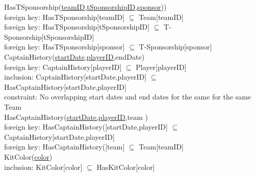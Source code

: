{\color{ForestGreen}HasTSponsorship(\underline{teamID},\underline{tSponsorshipID},\underline{sponsor}))}\\
{\color{Orange}\hspace{2mm} foreign key: {\color{Magenta}HasTSponsorship[teamID] $\subseteq$ Team[teamID]}} \\
{\color{Orange}\hspace{2mm} foreign key: {\color{Magenta}HasTSponsorship[tSponsorshipID] $\subseteq$ T-Sponsorship[tSponsorshipID]}} \\
{\color{Orange}\hspace{2mm} foreign key: {\color{Magenta}HasTSponsorship[sponsor] $\subseteq$ T-Sponsorship[sponsor]}} \\

{\color{ForestGreen}CaptainHistory(\underline{startDate,playerID},endDate)}\\
{\color{Orange}\hspace{2mm} foreign key: {\color{Magenta}CaptainHistory[playerID] $\subseteq$ Player[playerID]}} \\
{\color{Orange}\hspace{2mm} inclusion: {\color{Magenta}CaptainHistory[startDate,playerID] $\subseteq$ HasCaptainHistory[startDate,playerID]}} \\
{\color{Orange}\hspace{2mm} constraint: {\color{Magenta}No overlapping start dates and end dates for the same for the same Team}} \\

{\color{ForestGreen}HasCaptainHistory(\underline{startDate,playerID},team )}\\
{\color{Orange}\hspace{2mm} foreign key: {\color{Magenta}HasCaptainHistory([startDate,playerID] $\subseteq$ CaptainHistory[startDate,playerID]}} \\
{\color{Orange}\hspace{2mm} foreign key: {\color{Magenta}HasCaptainHistory([team] $\subseteq$ Team[teamID]}} \\



{\color{ForestGreen}KitColor(\underline{color})}\\
{\color{Orange}\hspace{2mm} inclusion: {\color{Magenta}KitColor[color] $\subseteq$ HasKitColor[color]}} \\

